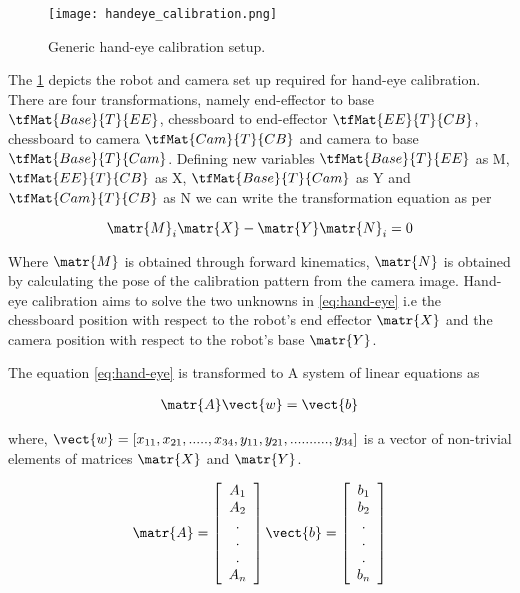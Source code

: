 \begin{figure}[hbt!]
	\centering
	\texttt{[image: handeye\_calibration.png]}
	\caption{Generic hand-eye calibration setup.} 
	\label{fig:handeye_calibration_setup}
\end{figure}

The \cref{fig:handeye_calibration_setup} depicts the robot and camera set up required for hand-eye calibration. There are four transformations, namely end-effector  to base  $\tfMat{Base}{T}{EE}$, chessboard to end-effector  $\tfMat{EE}{T}{CB}$, chessboard to camera  $\tfMat{Cam}{T}{CB}$ and camera to base  $\tfMat{Base}{T}{Cam}$. Defining new variables  $\tfMat{Base}{T}{EE}$ as M,  $\tfMat{EE}{T}{CB}$ as X,  $\tfMat{Base}{T}{Cam}$ as Y and  $\tfMat{Cam}{T}{CB}$ as N we can write the transformation equation as per \cite{ernst} 

\begin{equation}
\matr{M}_i\matr{X} - \matr{Y}\matr{N}_i = 0 
\label{eq:hand-eye}
\end{equation}

Where $\matr{M}$ is obtained through forward kinematics, $\matr{N}$ is obtained by calculating the pose of the calibration pattern from the camera image. Hand-eye calibration aims to solve the two unknowns in \cref{eq:hand-eye} i.e the chessboard position with respect to the robot's end effector $\matr{X}$ and the camera position with respect to the robot's base $\matr{Y}$.

The equation \ref{eq:hand-eye} is transformed to A system of linear equations as  

\begin{equation}
\centering
\begin{split}
\matr{A} \vect{w} = \vect{b}\\
\end{split}
\label{eq:hand-eye_least_square}
\end{equation}

where, $\vect{w} = [x_{11}, x_{21},.....,x_{34},y_{11},y_{21},..........,y_{34}]$ is a vector of non-trivial elements of matrices $\matr{X}$ and $\matr{Y}$. 

\begin{equation*}
	\matr{A} =
	\left[ 
	\begin{array}{c} A_1\\ A_2\\ .\\ .\\ .\\ A_n \end{array} 
	\right]
	\vect{b} = 
	\left[ 
	\begin{array}{c} b_1\\ b_2\\ .\\ .\\ .\\ b_n \end{array} 
	\right]
\end{equation*}

